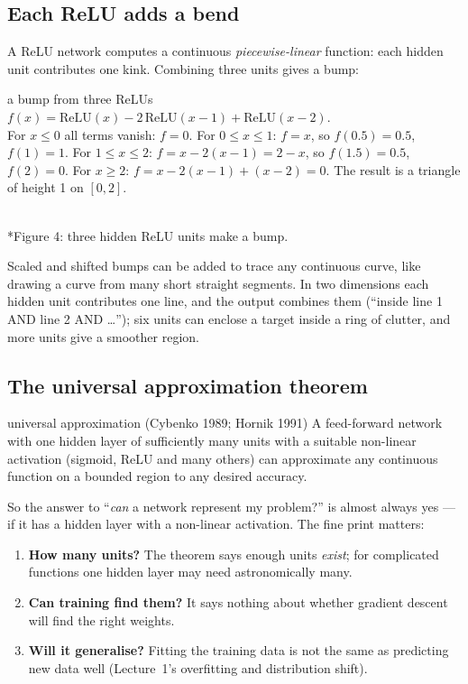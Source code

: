 \documentclass[11pt]{article}
\begin{document}
\subsection{Each ReLU adds a bend}
A ReLU network computes a continuous \emph{piecewise-linear} function: each hidden unit contributes one kink. Combining three units gives a bump:
\begin{example}{a bump from three ReLUs}
$f(x)=\text{ReLU}(x)-2\,\text{ReLU}(x-1)+\text{ReLU}(x-2)$.\\
For $x\le0$ all terms vanish: $f=0$. For $0\le x\le1$: $f=x$, so $f(0.5)=0.5$, $f(1)=1$. For $1\le x\le2$: $f=x-2(x-1)=2-x$, so $f(1.5)=0.5$, $f(2)=0$. For $x\ge2$: $f=x-2(x-1)+(x-2)=0$. The result is a triangle of height 1 on $[0,2]$.
\end{example}
\begin{center}\\*{\small\color{GreyN}Figure 4: three hidden ReLU units make a bump.}\end{center}
Scaled and shifted bumps can be added to trace any continuous curve, like drawing a curve from many short straight segments. In two dimensions each hidden unit contributes one line, and the output combines them (``inside line 1 AND line 2 AND \dots''); six units can enclose a target inside a ring of clutter, and more units give a smoother region.

\subsection{The universal approximation theorem}
\begin{definition}{universal approximation (Cybenko 1989; Hornik 1991)}
A feed-forward network with one hidden layer of sufficiently many units with a suitable non-linear activation (sigmoid, ReLU and many others) can approximate any continuous function on a bounded region to any desired accuracy.
\end{definition}
So the answer to ``\emph{can} a network represent my problem?'' is almost always yes --- if it has a hidden layer with a non-linear activation. The fine print matters:
\begin{enumerate}
\item \textbf{How many units?} The theorem says enough units \emph{exist}; for complicated functions one hidden layer may need astronomically many.
\item \textbf{Can training find them?} It says nothing about whether gradient descent will find the right weights.
\item \textbf{Will it generalise?} Fitting the training data is not the same as predicting new data well (Lecture~1's overfitting and distribution shift).
\end{enumerate}
\end{document}
